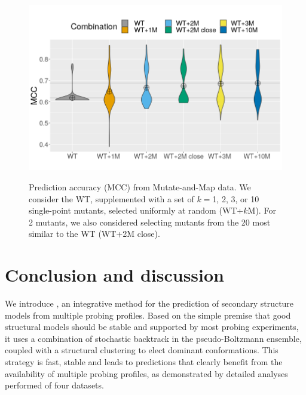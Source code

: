 \documentclass[a4,center,fleqn]{NAR}
\begin{document}
\begin{figure}
	{\centering
		\includegraphics[width=\linewidth]{graphs/combinationscale.png}\\}
		
	\caption{Prediction accuracy (MCC) from Mutate-and-Map data. We consider the WT, supplemented with a set of $k=$1, 2, 3, or 10 single-point mutants, selected uniformly at random ({\sf WT+$k$M}). For 2 mutants, we also considered selecting mutants from the 20 most similar to the WT ({\sf WT+2M close}).}\label{fig:variantanalysis}
\end{figure}












\section*{Conclusion and discussion}

We introduce \OurTool{}, an integrative method for the prediction of secondary structure models from multiple probing profiles. Based on the simple premise that good structural models should be stable and supported by most probing experiments, it uses a combination of stochastic backtrack in the pseudo-Boltzmann ensemble, coupled with a structural clustering to elect dominant conformations. This strategy is fast, stable and leads to predictions that clearly benefit from the availability of multiple probing profiles, as demonstrated by detailed analyses performed of four datasets. 
\end{document}
